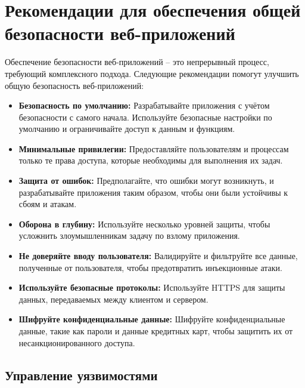 \documentclass[a4paper,12pt]{diplom}
\begin{document}
	 				
	 				
	 				
	 				
	 				
	 				
	 				
	 				
	 				
	 				
	 				
	 				
	 				
	 
	 \section{Рекомендации для обеспечения общей безопасности веб-приложений}
	 
	 Обеспечение безопасности веб-приложений – это непрерывный процесс, требующий комплексного подхода. Следующие рекомендации помогут улучшить общую безопасность веб-приложений:
	 
	 \begin{itemize}
	 	\item \textbf{Безопасность по умолчанию:} Разрабатывайте приложения с учётом безопасности с самого начала. Используйте безопасные настройки по умолчанию и ограничивайте доступ к данным и функциям.
	 	\item \textbf{Минимальные привилегии:} Предоставляйте пользователям и процессам только те права доступа, которые необходимы для выполнения их задач.
	 	\item \textbf{Защита от ошибок:} Предполагайте, что ошибки могут возникнуть, и разрабатывайте приложения таким образом, чтобы они были устойчивы к сбоям и атакам.
	 	\item \textbf{Оборона в глубину:} Используйте несколько уровней защиты, чтобы усложнить злоумышленникам задачу по взлому приложения.
	 	\item \textbf{Не доверяйте вводу пользователя:} Валидируйте и фильтруйте все данные, полученные от пользователя, чтобы предотвратить инъекционные атаки.
	 	\item \textbf{Используйте безопасные протоколы:} Используйте HTTPS для защиты данных, передаваемых между клиентом и сервером.
	 	\item \textbf{Шифруйте конфиденциальные данные:} Шифруйте конфиденциальные данные, такие как пароли и данные кредитных карт, чтобы защитить их от несанкционированного доступа.
	 \end{itemize}
	 
	 \subsection{Управление уязвимостями}
	 
\end{document}
